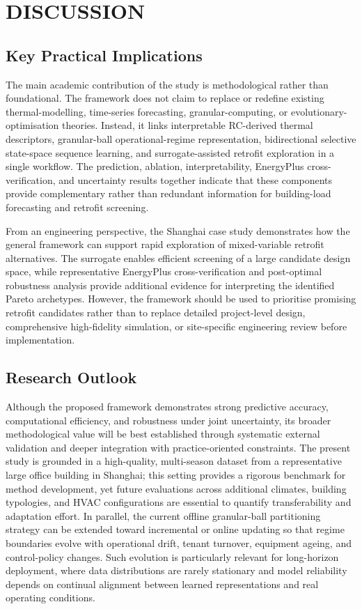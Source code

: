 \documentclass[11pt]{article}
\begin{document}
\section{DISCUSSION}

\subsection{Key Practical Implications}
The main academic contribution of the study is methodological rather than foundational. The framework does not claim to replace or redefine existing thermal-modelling, time-series forecasting, granular-computing, or evolutionary-optimisation theories. Instead, it links interpretable RC-derived thermal descriptors, granular-ball operational-regime representation, bidirectional selective state-space sequence learning, and surrogate-assisted retrofit exploration in a single workflow. The prediction, ablation, interpretability, EnergyPlus cross-verification, and uncertainty results together indicate that these components provide complementary rather than redundant information for building-load forecasting and retrofit screening.

From an engineering perspective, the Shanghai case study demonstrates how the general framework can support rapid exploration of mixed-variable retrofit alternatives. The surrogate enables efficient screening of a large candidate design space, while representative EnergyPlus cross-verification and post-optimal robustness analysis provide additional evidence for interpreting the identified Pareto archetypes. However, the framework should be used to prioritise promising retrofit candidates rather than to replace detailed project-level design, comprehensive high-fidelity simulation, or site-specific engineering review before implementation.

\subsection{Research Outlook}
Although the proposed framework demonstrates strong predictive accuracy, computational efficiency, and robustness under joint uncertainty, its broader methodological value will be best established through systematic external validation and deeper integration with practice-oriented constraints. The present study is grounded in a high-quality, multi-season dataset from a representative large office building in Shanghai; this setting provides a rigorous benchmark for method development, yet future evaluations across additional climates, building typologies, and HVAC configurations are essential to quantify transferability and adaptation effort. In parallel, the current offline granular-ball partitioning strategy can be extended toward incremental or online updating so that regime boundaries evolve with operational drift, tenant turnover, equipment ageing, and control-policy changes. Such evolution is particularly relevant for long-horizon deployment, where data distributions are rarely stationary and model reliability depends on continual alignment between learned representations and real operating conditions.
\end{document}
